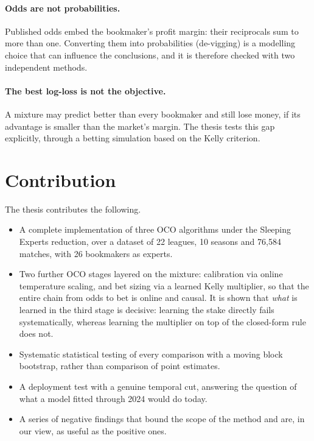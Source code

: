 \documentclass[12pt,a4paper,oneside]{report}
\renewcommand{\_}{\oldunderscore\allowbreak}
\theoremstyle{definition}
\theoremstyle{plain}
\theoremstyle{remark}
\begin{document}
\paragraph{Odds are not probabilities.} Published odds embed the bookmaker's profit margin:
their reciprocals sum to more than one. Converting them into probabilities (de-vigging) is a
modelling choice that can influence the conclusions, and it is therefore checked with two
independent methods.

\paragraph{The best log-loss is not the objective.} A mixture may predict better than every
bookmaker and still lose money, if its advantage is smaller than the market's margin. The
thesis tests this gap explicitly, through a betting simulation based on the Kelly criterion.

\section{Contribution}

The thesis contributes the following.

\begin{itemize}
  \item A complete implementation of three OCO algorithms under the Sleeping Experts
        reduction, over a dataset of 22 leagues, 10 seasons and 76,584 matches, with 26
        bookmakers as experts.
  \item Two further OCO stages layered on the mixture: calibration via online temperature
        scaling, and bet sizing via a learned Kelly multiplier, so that the entire chain from
        odds to bet is online and causal. It is shown that \emph{what} is learned in the third
        stage is decisive: learning the stake directly fails systematically, whereas learning
        the multiplier on top of the closed-form rule does not.
  \item Systematic statistical testing of every comparison with a moving block bootstrap,
        rather than comparison of point estimates.
  \item A deployment test with a genuine temporal cut, answering the question of what a model
        fitted through 2024 would do today.
  \item A series of negative findings that bound the scope of the method and are, in our view,
        as useful as the positive ones.
\end{itemize}
\end{document}
